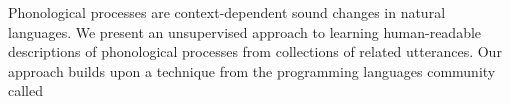 Phonological processes are context-dependent sound changes in natural  languages. We present an unsupervised approach to learning human-readable descriptions of phonological processes from collections of related utterances. Our approach builds upon a technique from the programming languages community called